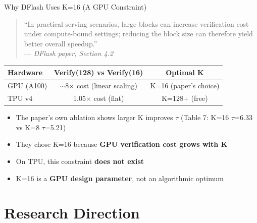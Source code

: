 \documentclass[10pt]{beamer}
\begin{document}
\begin{frame}{Why DFlash Uses K=16 (A GPU Constraint)}

\begin{quote}
\footnotesize
``In practical serving scenarios, large blocks can increase verification cost under compute-bound settings; reducing the block size can therefore yield better overall speedup.''\\
\hfill--- \textit{DFlash paper, Section 4.2}
\end{quote}

\vspace{0.5em}
\centering
\footnotesize
\begin{tabular}{l cc}
\toprule
\textbf{Hardware} & \textbf{Verify(128) vs Verify(16)} & \textbf{Optimal K} \\
\midrule
\rowcolor{rowred}
GPU (A100) & $\sim$8$\times$ cost (linear scaling) & K=16 (paper's choice) \\
\rowcolor{rowgreen}
TPU v4 & 1.05$\times$ cost (flat) & K=128+ (free) \\
\bottomrule
\end{tabular}

\vspace{0.8em}
\begin{itemize}
  \item The paper's own ablation shows larger K improves $\tau$ (Table 7: K=16 $\tau$=6.33 vs K=8 $\tau$=5.21)
  \item They chose K=16 because \textbf{GPU verification cost grows with K}
  \item On TPU, this constraint \textbf{does not exist}
  \item K=16 is a \textbf{GPU design parameter}, not an algorithmic optimum
\end{itemize}
\end{frame}

\section{Research Direction}
\end{document}

